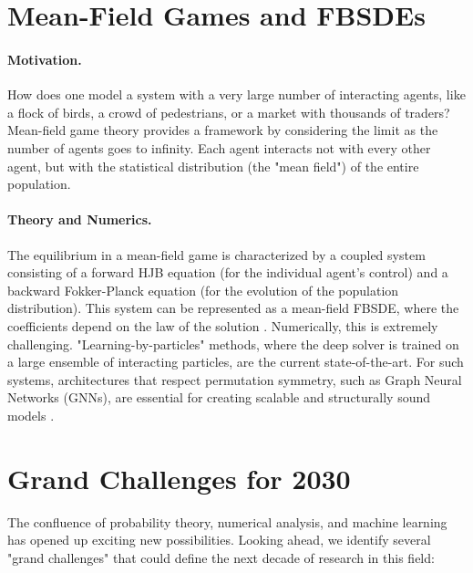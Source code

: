 \documentclass[11pt,letterpaper,oneside]{article}
\theoremstyle{plain}
\theoremstyle{definition}
\theoremstyle{remark}
\begin{document}
\section{Mean-Field Games and FBSDEs}
\label{sec:meanfield}

\paragraph{Motivation.} How does one model a system with a very large number of interacting agents, like a flock of birds, a crowd of pedestrians, or a market with thousands of traders? Mean-field game theory provides a framework by considering the limit as the number of agents goes to infinity. Each agent interacts not with every other agent, but with the statistical distribution (the "mean field") of the entire population.

\paragraph{Theory and Numerics.} The equilibrium in a mean-field game is characterized by a coupled system consisting of a forward HJB equation (for the individual agent's control) and a backward Fokker-Planck equation (for the evolution of the population distribution). This system can be represented as a mean-field FBSDE, where the coefficients depend on the law of the solution \cite{Carmona2016}. Numerically, this is extremely challenging. "Learning-by-particles" methods, where the deep solver is trained on a large ensemble of interacting particles, are the current state-of-the-art. For such systems, architectures that respect permutation symmetry, such as Graph Neural Networks (GNNs), are essential for creating scalable and structurally sound models \cite{MAGNet2019, GMADDPG2023}.

\section{Grand Challenges for 2030}
\label{sec:challenges}

The confluence of probability theory, numerical analysis, and machine learning has opened up exciting new possibilities. Looking ahead, we identify several "grand challenges" that could define the next decade of research in this field:
\end{document}
